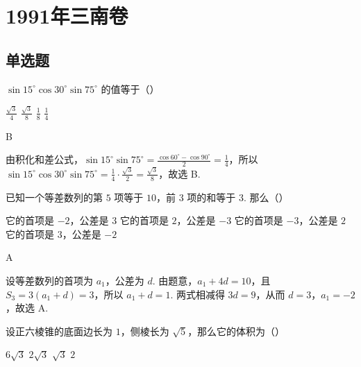 \documentclass[UTF8,a4paper,oneside,11pt]{ctexbook}
\begin{document}
\mainmatter

\chapter{1991年三南卷}
\section{单选题}

\begin{problem}
\(\sin 15^{\circ}\cos 30^{\circ}\sin 75^{\circ}\) 的值等于（\quad）

\choices
    {\(\frac{\sqrt{3}}{4}\)}
    {\(\frac{\sqrt{3}}{8}\)}
    {\(\frac{1}{8}\)}
    {\(\frac{1}{4}\)}

\end{problem}

\begin{answer}
B
\end{answer}

\begin{solution}
由积化和差公式，\(\sin 15^{\circ}\sin 75^{\circ}=\frac{\cos 60^{\circ}-\cos 90^{\circ}}{2}=\frac{1}{4}\)，所以 \(\sin 15^{\circ}\cos 30^{\circ}\sin 75^{\circ}=\frac{1}{4}\cdot\frac{\sqrt{3}}{2}=\frac{\sqrt{3}}{8}\)，故选 B.
\end{solution}

\begin{problem}
已知一个等差数列的第 \(5\) 项等于 \(10\)，前 \(3\) 项的和等于 \(3\). 那么（\quad）

\choices
    {它的首项是 \(-2\)，公差是 \(3\)}
    {它的首项是 \(2\)，公差是 \(-3\)}
    {它的首项是 \(-3\)，公差是 \(2\)}
    {它的首项是 \(3\)，公差是 \(-2\)}

\end{problem}

\begin{answer}
A
\end{answer}

\begin{solution}
设等差数列的首项为 \(a_1\)，公差为 \(d\). 由题意，\(a_1+4d=10\)，且 \(S_3=3(a_1+d)=3\)，所以 \(a_1+d=1\). 两式相减得 \(3d=9\)，从而 \(d=3\)，\(a_1=-2\)，故选 A.
\end{solution}

\begin{problem}
设正六棱锥的底面边长为 \(1\)，侧棱长为 \(\sqrt{5}\)，那么它的体积为（\quad）

\choices
    {\(6\sqrt{3}\)}
    {\(2\sqrt{3}\)}
    {\(\sqrt{3}\)}
    {\(2\)}

\end{problem}
\end{document}
